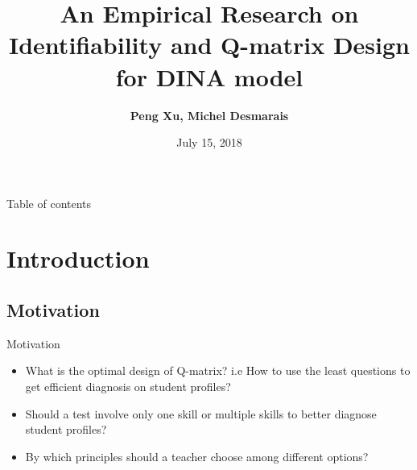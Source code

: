 \documentclass[handout]{beamer}
\begin{document}

\author[Peng Xu \& Michel Demarais]{\textbf {Peng Xu, Michel Desmarais}}
\title[Title]{An Empirical Research on Identifiability and Q-matrix Design for DINA model}
\date{July 15, 2018}
\frame{\titlepage}



\begin{frame}{Table of contents}
\begin{multicols}{2}
  \tableofcontents
\end{multicols}
\end{frame}


\section{Introduction}


\subsection{Motivation}
\begin{frame}{Motivation}
\begin{itemize}
	\item
		What is the optimal design of Q-matrix? i.e How to use the least questions to get efficient diagnosis on student profiles?
	\item
		Should a test involve only one skill or multiple skills to better diagnose student profiles?
	\item
		By which principles should a teacher choose among different options?
\end{itemize}
\end{frame}
\end{document}
